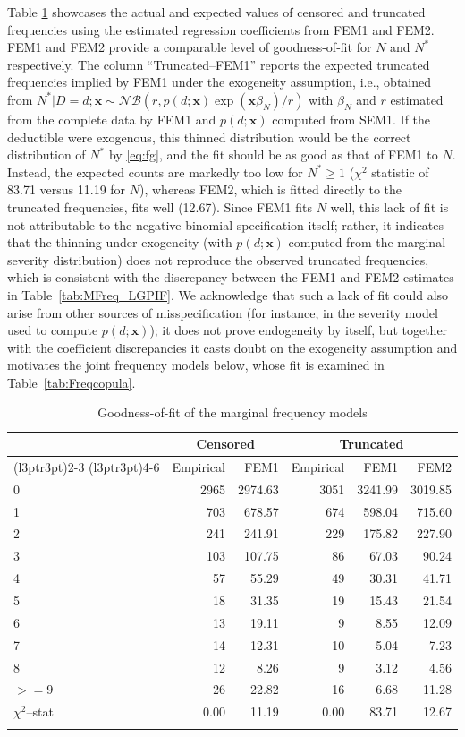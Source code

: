 \documentclass[11pt]{article}
\newcommand{\rev}[1]{{\color{blue}#1}}
\begin{document}
Table \ref{tab:FreqmarginalGOF} showcases the actual and expected values of censored and truncated frequencies using the estimated regression coefficients from FEM1 and FEM2. FEM1 and FEM2 provide a comparable level of goodness-of-fit for $N$ and $N^*$ respectively. \rev{The column ``Truncated--FEM1'' reports the expected truncated frequencies implied by FEM1 under the exogeneity assumption, i.e., obtained from $N^*|D=d;\bm{x}\sim\mathcal{NB}(r, p(d;\bm{x})\exp(\bm{x}\beta_N)/r)$ with $\beta_N$ and $r$ estimated from the complete data by FEM1 and $p(d;\bm{x})$ computed from SEM1. If the deductible were exogenous, this thinned distribution would be the correct distribution of $N^*$ by \eqref{eq:fg}, and the fit should be as good as that of FEM1 to $N$. Instead, the expected counts are markedly too low for $N^*\ge 1$ ($\chi^2$ statistic of 83.71 versus 11.19 for $N$), whereas FEM2, which is fitted directly to the truncated frequencies, fits well (12.67). Since FEM1 fits $N$ well, this lack of fit is not attributable to the negative binomial specification itself; rather, it indicates that the thinning under exogeneity (with $p(d;\bm{x})$ computed from the marginal severity distribution) does not reproduce the observed truncated frequencies, which is consistent with the discrepancy between the FEM1 and FEM2 estimates in Table~\ref{tab:MFreq_LGPIF}. We acknowledge that such a lack of fit could also arise from other sources of misspecification (for instance, in the severity model used to compute $p(d;\bm{x})$); it does not prove endogeneity by itself, but together with the coefficient discrepancies it casts doubt on the exogeneity assumption and motivates the joint frequency models below, whose fit is examined in Table~\ref{tab:Freqcopula}.}

\begin{table}[!h]
\centering
\color{blue}
\begin{tabular}[t]{lrrrrr}
\toprule
\multicolumn{1}{c}{ } & \multicolumn{2}{c}{Censored} & \multicolumn{3}{c}{Truncated} \\
\cmidrule(l{3pt}r{3pt}){2-3} \cmidrule(l{3pt}r{3pt}){4-6}
  & Empirical & FEM1 & Empirical & FEM1 & FEM2\\
\midrule
0 & 2965 & 2974.63 & 3051 & 3241.99 & 3019.85\\
1 & 703 & 678.57 & 674 & 598.04 & 715.60\\
2 & 241 & 241.91 & 229 & 175.82 & 227.90\\
3 & 103 & 107.75 & 86 & 67.03 & 90.24\\
4 & 57 & 55.29 & 49 & 30.31 & 41.71\\
5 & 18 & 31.35 & 19 & 15.43 & 21.54\\
6 & 13 & 19.11 & 9 & 8.55 & 12.09\\
7 & 14 & 12.31 & 10 & 5.04 & 7.23\\
8 & 12 & 8.26 & 9 & 3.12 & 4.56\\
$>=9$ & 26 & 22.82 & 16 & 6.68 & 11.28\\
\hline
$\chi^2$--stat & 0.00 & 11.19 & 0.00 & 83.71 & 12.67\\
\hhline{======}
\end{tabular}
\caption{Goodness-of-fit of the marginal frequency models}
\label{tab:FreqmarginalGOF}
\end{table}
\end{document}
